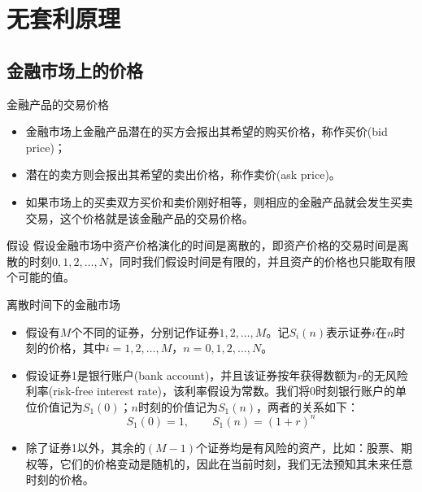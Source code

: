 \documentclass[t]{beamer}
\begin{document}
\section{无套利原理}

\subsection{金融市场上的价格}
\begin{frame}{金融产品的交易价格}\normalsize
\begin{itemize}
\item 金融市场上金融产品潜在的买方会报出其希望的购买价格，称作买价(bid price)；
\item 潜在的卖方则会报出其希望的卖出价格，称作卖价(ask price)。
\item 如果市场上的买卖双方买价和卖价刚好相等，则相应的金融产品就会发生买卖交易，这个价格就是该金融产品的交易价格。
\end{itemize}

\begin{block}{假设}
假设金融市场中资产价格演化的时间是{\color{red}离散}的，即资产价格的交易时间是离散的时刻$0,1,2,\ldots,N$，同时我们假设时间是有限的，并且资产的价格也只能取有限个可能的值。
\end{block}
\end{frame}

\begin{frame}{离散时间下的金融市场}
\begin{itemize}
\item 假设有$M$个不同的证券，分别记作证券$1,2,\ldots,M$。记$S_i(n)$表示证券$i$在$n$时刻的价格，其中$i=1,2,\ldots,M$，$n=0,1,2,\ldots,N$。
\item 假设证券1是银行账户(bank account)，并且该证券按年获得数额为$r$的无风险利率(risk-free interest rate)，该利率假设为常数。我们将0时刻银行账户的单位价值记为$S_1(0)$；$n$时刻的价值记为$S_1(n)$，两者的关系如下：
\[S_1(0)=1 ,\qquad S_1(n)=(1+r)^n \]
\item 除了证券1以外，其余的$(M-1)$个证券均是有风险的资产，比如：股票、期权等，它们的价格变动是随机的，因此在当前时刻，我们无法预知其未来任意时刻的价格。
\end{itemize}
\end{frame}
\end{document}
